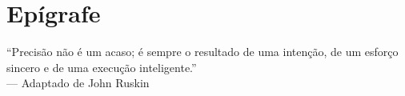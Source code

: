\chapter*{Epígrafe}
\vspace{2cm}
\begin{flushright}
    ``Precisão não é um acaso; é sempre o resultado de uma intenção, de um
    esforço sincero e de uma execução inteligente.''\\
    --- Adaptado de John Ruskin
\end{flushright}
